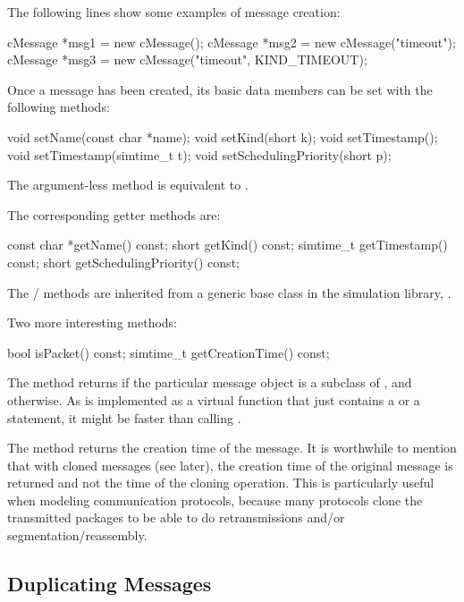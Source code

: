 The following lines show some examples of message creation:

\begin{cpp}
cMessage *msg1 = new cMessage();
cMessage *msg2 = new cMessage("timeout");
cMessage *msg3 = new cMessage("timeout", KIND_TIMEOUT);
\end{cpp}

Once a message has been created, its basic data members can be set
with the following methods:

\begin{cpp}
void setName(const char *name);
void setKind(short k);
void setTimestamp();
void setTimestamp(simtime_t t);
void setSchedulingPriority(short p);
\end{cpp}

The argument-less  method is equivalent to
.

The corresponding getter methods are:

\begin{cpp}
const char *getName() const;
short getKind() const;
simtime_t getTimestamp() const;
short getSchedulingPriority() const;
\end{cpp}

The / methods are inherited from
a generic base class in the simulation library, .

Two more interesting methods:

\begin{cpp}
bool isPacket() const;
simtime_t getCreationTime() const;
\end{cpp}

The  method returns  if the particular message
object is a subclass of , and  otherwise. As
 is implemented as a virtual function that just contains
a  or a  statement, it might be faster
than calling .

The  method returns the creation time of the
message. It is worthwhile to mention that with cloned messages (see
 later), the creation time of the original message is returned
and not the time of the cloning operation. This is particularly useful when
modeling communication protocols, because many protocols clone the
transmitted packages to be able to do retransmissions and/or
segmentation/reassembly.


\subsection{Duplicating Messages}

